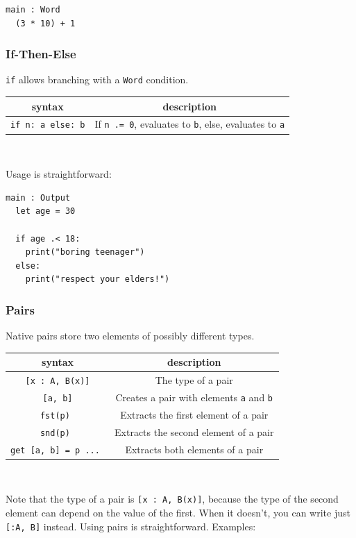 \documentclass{article}
\theoremstyle{definition}
\theoremstyle{theorem}
\begin{document}
\begin{lstlisting}
main : Word
  (3 * 10) + 1
\end{lstlisting}

\subsubsection{If-Then-Else}

\verb|if| allows branching with a \verb|Word| condition.

 \hfill \newline
\begin{tabular}{ c | c }
syntax & description \\\hline
\verb|if n: a else: b| & If \verb|n .= 0|, evaluates to \verb|b|, else, evaluates to \verb|a|
\end{tabular}
\\ \hfill \newline

Usage is straightforward:

\begin{lstlisting}
main : Output
  let age = 30

  if age .< 18:
    print("boring teenager")
  else:
    print("respect your elders!")
\end{lstlisting}

\subsubsection{Pairs}

Native pairs store two elements of possibly different types.

\begin{tabular}{ c | c }
syntax & description \\\hline
\verb|[x : A, B(x)]| & The type of a pair\\
\verb|[a, b]| & Creates a pair with elements \verb|a| and \verb|b|\\
\verb|fst(p) | & Extracts the first element of a pair\\
\verb|snd(p) | & Extracts the second element of a pair\\
\verb|get [a, b] = p ... | &Extracts both elements of a pair\\
\end{tabular}
\\
\hfill
\newline

Note that the type of a pair is \verb|[x : A, B(x)]|, because the type of the
second element can depend on the value of the first. When it doesn't, you can
write just \verb|[:A, B]| instead. Using pairs is straightforward. Examples:
\end{document}
